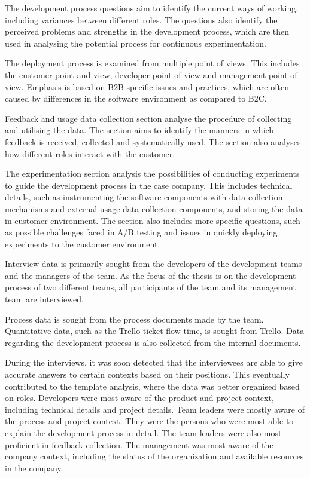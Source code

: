 \documentclass[english]{tktltiki2}
\theoremstyle{definition}
\theoremstyle{remark}
\begin{document}
The development process questions aim to identify the current ways of working, including variances between different roles. The questions also identify the perceived problems and strengths in the development process, which are then used in analysing the potential process for continuous experimentation. 

The deployment process is examined from multiple point of views. This includes the customer point and view, developer point of view and management point of view. Emphasis is based on B2B specific issues and practices, which are often caused by differences in the software environment as compared to B2C.  

Feedback and usage data collection section analyse the procedure of collecting and utilising the data. The section aims to identify the manners in which feedback is received, collected and systematically used. The section also analyses how different roles interact with the customer. 

The experimentation section analysis the possibilities of conducting experiments to guide the development process in the case company. This includes technical details, such as instrumenting the software components with data collection mechanisms and external usage data collection components, and storing the data in customer environment. The section also includes more specific questions, such as possible challenges faced in A/B testing and issues in quickly deploying experiments to the customer environment.  

Interview data is primarily sought from the developers of the development teams and the managers of the team. As the focus of the thesis is on the development process of two different teams, all participants of the team and its management team are interviewed. 

Process data is sought from the process documents made by the team. Quantitative data, such as the Trello ticket flow time, is sought from Trello. Data regarding the development process is also collected from the internal documents.

During the interviews, it was soon detected that the interviewees are able to give accurate answers to certain contexts based on their positions. This eventually contributed to the template analysis, where the data was better organised based on roles. Developers were most aware of the product and project context, including technical details and project details. Team leaders were mostly aware of the process and project context. They were the persons who were most able to explain the development process in detail. The team leaders were also most proficient in feedback collection. The management was most aware of the company context, including the status of the organization and available resources in the company. 
\end{document}
